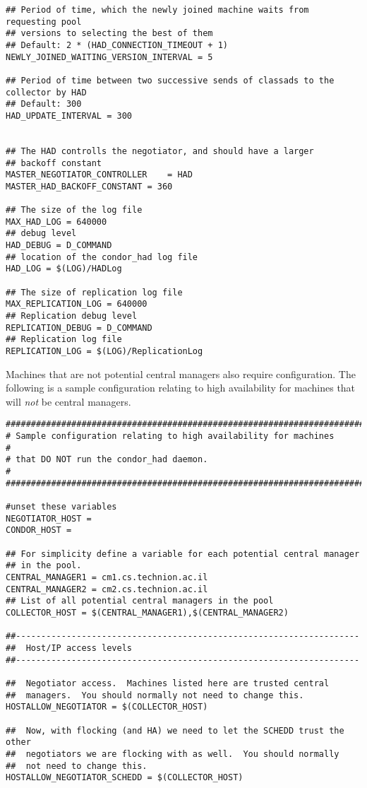\begin{verbatim}
## Period of time, which the newly joined machine waits from requesting pool 
## versions to selecting the best of them
## Default: 2 * (HAD_CONNECTION_TIMEOUT + 1)
NEWLY_JOINED_WAITING_VERSION_INTERVAL = 5

## Period of time between two successive sends of classads to the collector by HAD
## Default: 300
HAD_UPDATE_INTERVAL = 300


## The HAD controlls the negotiator, and should have a larger
## backoff constant
MASTER_NEGOTIATOR_CONTROLLER	= HAD
MASTER_HAD_BACKOFF_CONSTANT	= 360

## The size of the log file
MAX_HAD_LOG = 640000
## debug level 
HAD_DEBUG = D_COMMAND
## location of the condor_had log file
HAD_LOG = $(LOG)/HADLog

## The size of replication log file
MAX_REPLICATION_LOG = 640000
## Replication debug level 
REPLICATION_DEBUG = D_COMMAND
## Replication log file
REPLICATION_LOG = $(LOG)/ReplicationLog

\end{verbatim}
\normalsize

Machines that are not potential central managers also 
require configuration.
The following is a sample configuration relating to
high availability for machines that will \emph{not} be central managers.

\footnotesize
\begin{verbatim}
##########################################################################
# Sample configuration relating to high availability for machines        # 
# that DO NOT run the condor_had daemon.                                 #
##########################################################################

#unset these variables 
NEGOTIATOR_HOST =
CONDOR_HOST =

## For simplicity define a variable for each potential central manager
## in the pool. 
CENTRAL_MANAGER1 = cm1.cs.technion.ac.il
CENTRAL_MANAGER2 = cm2.cs.technion.ac.il
## List of all potential central managers in the pool
COLLECTOR_HOST = $(CENTRAL_MANAGER1),$(CENTRAL_MANAGER2)

##--------------------------------------------------------------------
##  Host/IP access levels
##--------------------------------------------------------------------

##  Negotiator access.  Machines listed here are trusted central
##  managers.  You should normally not need to change this.
HOSTALLOW_NEGOTIATOR = $(COLLECTOR_HOST)

##  Now, with flocking (and HA) we need to let the SCHEDD trust the other 
##  negotiators we are flocking with as well.  You should normally 
##  not need to change this.
HOSTALLOW_NEGOTIATOR_SCHEDD = $(COLLECTOR_HOST) 
\end{verbatim}
\normalsize

